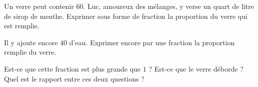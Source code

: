 
    Un verre peut contenir \unit{60}{\centi\liter}. Luc, amoureux des mélanges, y verse un quart de litre de sirop de menthe. Exprimer sous forme de fraction la proportion du verre qui est remplie.

    Il y ajoute encore \unit{40}{\centi\liter} d'eau. Exprimer encore par une fraction la proportion remplie du verre.

    Est-ce que cette fraction est plus grande que \( 1\) ? Est-ce que le verre déborde ? Quel est le rapport entre ces deux questions ?
